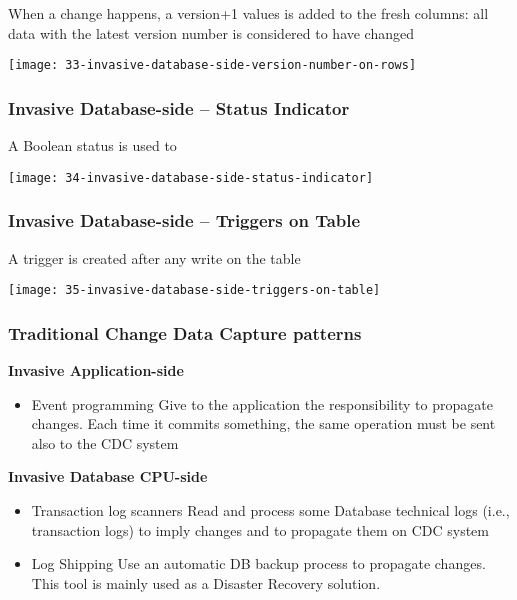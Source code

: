 When a change happens, a version+1 values is added to the fresh columns: all data with the latest version number is considered to have changed

\begin{center}
\texttt{[image: 33-invasive-database-side-version-number-on-rows]}
\end{center}

\subsubsection{Invasive Database-side – Status Indicator}

A Boolean status is used to 

\begin{center}
\texttt{[image: 34-invasive-database-side-status-indicator]}
\end{center}

\subsubsection{Invasive Database-side – Triggers on Table}

A trigger is created after any write on the table

\begin{center}
\texttt{[image: 35-invasive-database-side-triggers-on-table]}
\end{center}

\subsubsection{Traditional Change Data Capture patterns}

\textbf{Invasive Application-side}

\begin{itemize}
	\item Event programming
	Give to the application the responsibility to propagate changes. Each time it commits something, the same operation must be sent also to the CDC system
\end{itemize}

\textbf{Invasive Database CPU-side}

\begin{itemize}
	\item Transaction log scanners
	Read and process some Database technical logs (i.e., transaction logs) to imply changes and to propagate them on CDC system
	\item Log Shipping
	Use an automatic DB backup process to propagate changes. This tool is mainly used as a Disaster Recovery solution.
\end{itemize}

